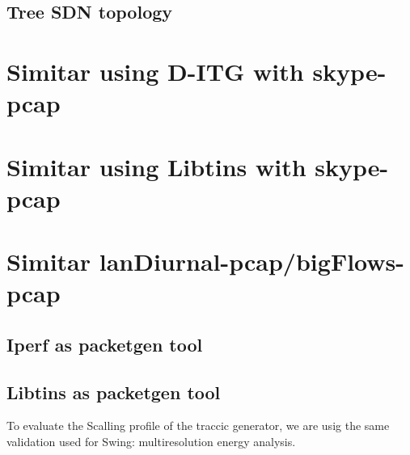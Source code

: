 \subsection{Tree SDN topology}


\section{Simitar using D-ITG with skype-pcap}

\section{Simitar using Libtins with skype-pcap}


\section{Simitar lanDiurnal-pcap/bigFlows-pcap}


\subsection{Iperf as packetgen tool}


\subsection{Libtins as packetgen tool}



To evaluate the Scalling profile of the traccic generator, we are usig the same validation used for Swing\cite{swing-paper}: multiresolution energy analysis.
